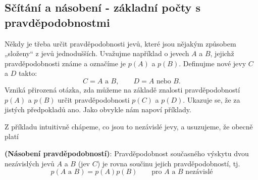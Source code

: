       

      

      

    \subsection{Sčítání a násobení - základní počty s pravděpodobnostmi}
      Někdy je třeba určit pravděpodobnosti jevů, které jsou nějakým způsobem „složeny“ z jevů
      jednodušších. Uvažujme například o jevech \(A\) a \(B\), jejichž pravděpodobnosti známe a 
      označíme je \(p(A)\) a \(p(B)\). Definujme nové jevy \(C\) a \(D\) takto:
      \begin{equation*}
        C = A \text{ a } B, \qquad D = A \text{ nebo } B.
      \end{equation*}
      Vzniká přirozená otázka, zda můžeme na základě znalosti pravděpodobností \(p(A)\) a \(p(B)\) 
      určit pravděpodobnosti \(p(C)\) a \(p(D)\). Ukazuje se, že za jistých předpokladů ano. Jako 
      obvykle nám napoví příklady.

      
      
      Z příkladu intuitivně chápeme, co jsou to nezávislé jevy, a usuzujeme, že obecně platí
      \begin{lemma}\label{mai:lemma003}
        \textbf{(Násobení pravděpodobností)}: Pravděpodobnost současného výskytu dvou nezávislých 
        jevů \(A\) a \(B\) (jev \(C\)) je rovna součinu jejich pravděpodobností, tj.
        \begin{equation}\label{mai:eq052}
           p(A \text{ a } B)= p(A)p(B)\qquad \text{pro } A \text{ a } B \text{ nezávislé}
        \end{equation}
      \end{lemma}
      

